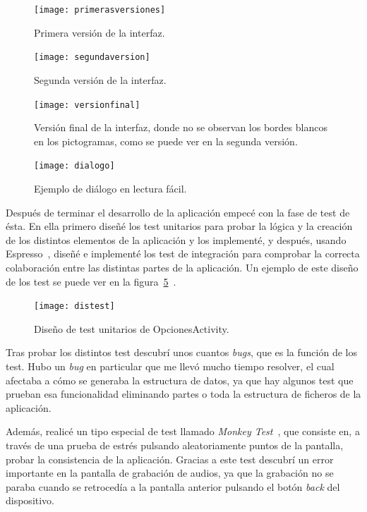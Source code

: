 \begin{figure}
	\centering
	\texttt{[image: primerasversiones]}
	\caption{Primera versión de la interfaz.}
	\label{fig:primver}
\end{figure}
\begin{figure}
	\centering
	\texttt{[image: segundaversion]}
	\caption{Segunda versión de la interfaz.}
	\label{fig:segver}
\end{figure}
\begin{figure}
	\centering
	\texttt{[image: versionfinal]}
	\caption{Versión final de la interfaz, donde no se observan los bordes blancos en los pictogramas, como se puede ver en la segunda versión.}
	\label{fig:verfi}
\end{figure}
\begin{figure}
	\centering
	\texttt{[image: dialogo]}
	\caption{Ejemplo de diálogo en lectura fácil.}
	\label{fig:dia}
\end{figure}

Después de terminar el desarrollo de la aplicación empecé con la fase de test de ésta. En ella primero diseñé los test unitarios para probar la lógica y la creación de los distintos elementos de la aplicación y los implementé, y después, usando Espresso~\cite{espresso}, diseñé e implementé los test de integración para comprobar la correcta colaboración entre las distintas partes de la aplicación. Un ejemplo de este diseño de los test se puede ver en la figura~\ref{fig:ditestun}~\cite{vypcn,vypcb,vypti}.

\begin{figure}
	\centering
	\texttt{[image: distest]}
	\caption{Diseño de test unitarios de OpcionesActivity.}
	\label{fig:ditestun}
\end{figure}

Tras probar los distintos test descubrí unos cuantos \textit{bugs}, que es la función de los test. Hubo un \textit{bug} en particular que me llevó mucho tiempo resolver, el cual afectaba a cómo se generaba la estructura de datos, ya que hay algunos test que prueban esa funcionalidad eliminando partes o toda la estructura de ficheros de la aplicación.

Además, realicé un tipo especial de test llamado \textit{Monkey Test}~\cite{monkeytest}, que consiste en, a través de una prueba de estrés pulsando aleatoriamente puntos de la pantalla, probar la consistencia de la aplicación. Gracias a este test descubrí un error importante en la pantalla de grabación de audios, ya que la grabación no se paraba cuando se retrocedía a la pantalla anterior pulsando el botón \textit{back} del dispositivo.
